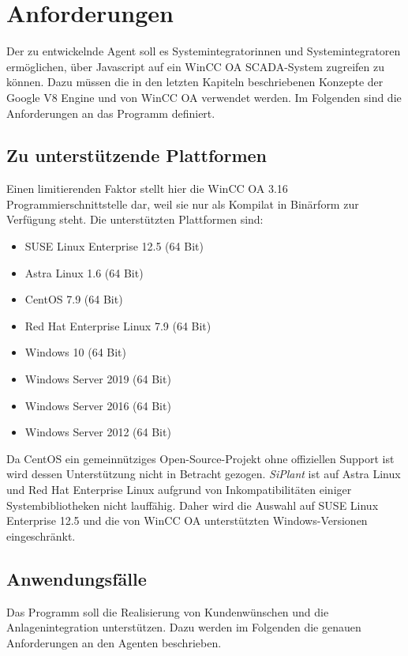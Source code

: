 \chapter{Anforderungen}
\label{cha:Anforderungen}

Der zu entwickelnde Agent soll es Systemintegratorinnen und Systemintegratoren ermöglichen, über Javascript auf ein WinCC OA SCADA-System 
zugreifen zu können. Dazu müssen die in den letzten Kapiteln beschriebenen Konzepte der Google V8 Engine und von WinCC OA verwendet werden. 
Im Folgenden sind die Anforderungen an das Programm definiert.

\section{Zu unterstützende Plattformen}

Einen limitierenden Faktor stellt hier die WinCC OA 3.16 Programmierschnittstelle dar, weil sie nur als Kompilat in Binärform zur Verfügung steht. Die
unterstützten Plattformen sind:

\begin{itemize}
 \item SUSE Linux Enterprise 12.5 (64 Bit)
 \item Astra Linux 1.6 (64 Bit)
 \item CentOS 7.9 (64 Bit)
 \item Red Hat Enterprise Linux 7.9 (64 Bit)
 \item Windows 10 (64 Bit)
 \item Windows Server 2019 (64 Bit)
 \item Windows Server 2016 (64 Bit)
 \item Windows Server 2012 (64 Bit) \\
\end{itemize}

Da CentOS ein gemeinnütziges Open-Source-Projekt ohne offiziellen Support ist \cite{centOS} wird dessen Unterstützung nicht in Betracht gezogen.
\textit{SiPlant} ist auf Astra Linux und Red Hat Enterprise Linux aufgrund von Inkompatibilitäten einiger Systembibliotheken nicht lauffähig.
Daher wird die Auswahl auf SUSE Linux Enterprise 12.5 und die von WinCC OA unterstützten Windows-Versionen eingeschränkt.

\section{Anwendungsfälle}

Das Programm soll die Realisierung von Kundenwünschen und die Anlagenintegration unterstützen.
Dazu werden im Folgenden die genauen Anforderungen an den Agenten beschrieben.


